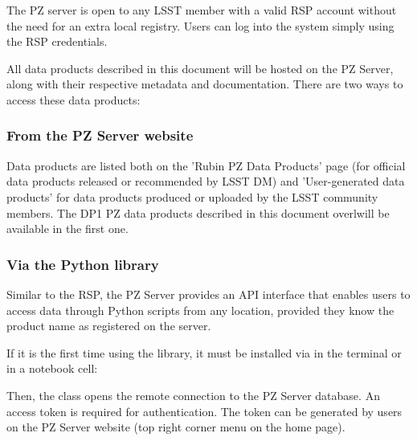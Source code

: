 The PZ server is open to any LSST member with a valid RSP account without the need for an extra local registry. Users can log into the system simply using the RSP credentials. 

All data products described in this document 
will be %
hosted on the PZ Server, along with their respective metadata and documentation. There are two ways to access these data products: 

\subsubsection{From the PZ Server website} 

Data products are listed both on the 'Rubin PZ Data Products' page (for official data products released or recommended by LSST DM) and 'User-generated data products' for data products produced or uploaded by the LSST community members. The DP1 PZ data products described in this document
overlwill be 
available in the first one. %


\subsubsection{Via the  Python library}

Similar to the RSP, the PZ Server provides an API interface that enables users to access data through Python scripts from any location, provided they know the product name as registered on the server. 
 
If it is the first time using the library, it must be installed via  in the terminal or in a notebook cell: 

Then, the  class opens the remote connection to the PZ Server database. An access token is required for authentication. The token can be generated by users on the PZ Server website (top right corner menu on the home page).    

